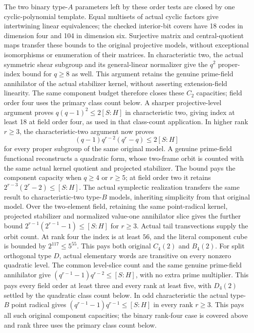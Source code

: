 The two binary type-$A$ parameters left by these order tests are closed
by one cyclic-polynomial template. Equal multisets of actual cyclic
factors give intertwining linear equivalences; the checked interior-bit
covers have 18 codes in dimension four and 104 in dimension six.
Surjective matrix and central-quotient maps transfer these bounds to
the original projective models, without exceptional isomorphisms or
enumeration of their matrices.
In characteristic two, the actual symmetric shear subgroup and its
general-linear normalizer give the $q^2$ proper-index bound for $q\geq8$
as well. This argument retains the genuine prime-field annihilator of
the actual stabilizer kernel, without asserting extension-field
linearity. The same component budget therefore closes these $C_2$
capacities; field order four uses the primary class count below. A sharper projective-level
argument proves $q(q-1)^2\leq2[S:H]$ in characteristic two, giving index
at least 18 at field order four, as used in that class-count application.
In higher rank $r\geq3$, the characteristic-two argument now proves
\[
  (q-1)q^{r-2}(q^r-q)\leq 2[S:H]
\]
for every proper subgroup of the same original model. A genuine
prime-field functional reconstructs a quadratic form, whose two-frame
orbit is counted with the same actual kernel quotient and projected
stabilizer. The bound pays the component capacity when $q\geq4$ or
$r\geq5$; at field order two it retains
$2^{r-3}(2^r-2)\leq[S:H]$.
The actual symplectic realization transfers the same result to
characteristic-two type-$B$ models, inheriting simplicity from that
original model. Over the two-element field, retaining the same point-radical
kernel, projected stabilizer and normalized value-one annihilator slice
gives the further bound $2^{r-1}(2^{r-1}-1)\leq[S:H]$ for $r\geq3$.
Actual tail transvections supply the orbit count. At rank four the index
is at least $56$, and the literal component cube is bounded by
$2^{117}\leq5^{55}$. This pays both original $C_4(2)$ and $B_4(2)$.
For split orthogonal type $D$, actual elementary words
are transitive on every nonzero quadratic level. The common level-slice
count and the same genuine prime-field annihilator give
$(q^{r-1}-1)q^{r-2}\leq[S:H]$, with no extra prime multiplier.
This pays every field order at least three and every rank at least five,
with $D_4(2)$ settled by the quadratic class count below.
In odd characteristic the actual type-$B$ point radical gives
$(q^{r-1}-1)q^{r-1}\leq[S:H]$ in every rank $r\geq3$.
This pays all such original component capacities; the binary rank-four
case is covered above and rank three uses the primary class count below.
